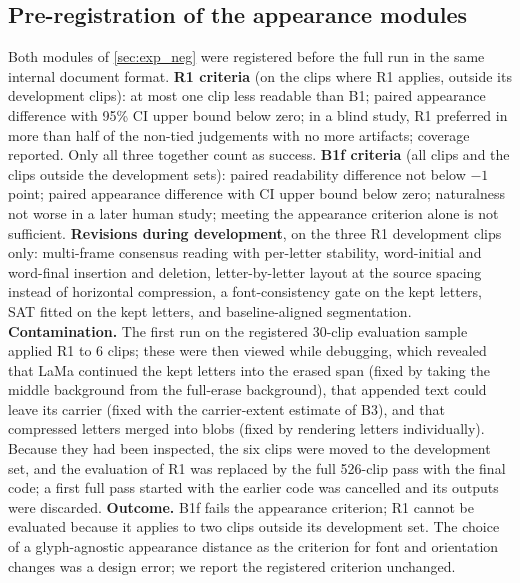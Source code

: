 \subsection{Pre-registration of the appearance modules}
\label{sec:supp_prereg_neg}
Both modules of \cref{sec:exp_neg} were registered before the full run in the same internal document format. \textbf{R1 criteria} (on the clips where R1 applies, outside its development clips): at most one clip less readable than B1; paired appearance difference with 95\% CI upper bound below zero; in a blind study, R1 preferred in more than half of the non-tied judgements with no more artifacts; coverage reported. Only all three together count as success. \textbf{B1f criteria} (all clips and the clips outside the development sets): paired readability difference not below $-1$ point; paired appearance difference with CI upper bound below zero; naturalness not worse in a later human study; meeting the appearance criterion alone is not sufficient. \textbf{Revisions during development}, on the three R1 development clips only: multi-frame consensus reading with per-letter stability, word-initial and word-final insertion and deletion, letter-by-letter layout at the source spacing instead of horizontal compression, a font-consistency gate on the kept letters, SAT fitted on the kept letters, and baseline-aligned segmentation. \textbf{Contamination.} The first run on the registered 30-clip evaluation sample applied R1 to 6 clips; these were then viewed while debugging, which revealed that LaMa continued the kept letters into the erased span (fixed by taking the middle background from the full-erase background), that appended text could leave its carrier (fixed with the carrier-extent estimate of B3), and that compressed letters merged into blobs (fixed by rendering letters individually). Because they had been inspected, the six clips were moved to the development set, and the evaluation of R1 was replaced by the full 526-clip pass with the final code; a first full pass started with the earlier code was cancelled and its outputs were discarded. \textbf{Outcome.} B1f fails the appearance criterion; R1 cannot be evaluated because it applies to two clips outside its development set. The choice of a glyph-agnostic appearance distance as the criterion for font and orientation changes was a design error; we report the registered criterion unchanged.

